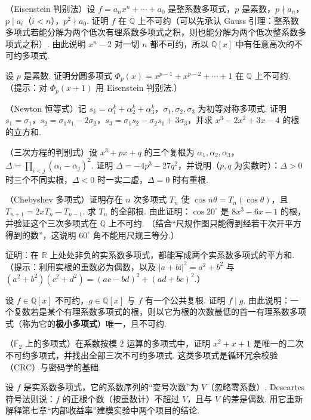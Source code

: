 {		\Cgroup
		\begin{exC}
			\item\label{ex:poly:C1} （Eisenstein 判别法）设 $f=a_nx^n+\cdots+a_0$ 是整系数多项式，$p$ 是素数，$p\nmid a_n$，$p\mid a_i$（$i<n$），$p^2\nmid a_0$. 证明 $f$ 在 $\mathbb{Q}$ 上不可约（可以先承认 Gauss 引理：整系数多项式若能分解为两个低次有理系数多项式之积，则也能分解为两个低次整系数多项式之积）. 由此说明 $x^n-2$ 对一切 $n$ 都不可约，所以 $\mathbb{Q}[x]$ 中有任意高次的不可约多项式.
			\item\label{ex:poly:C2} 设 $p$ 是素数. 证明分圆多项式 $\Phi_p(x)=x^{p-1}+x^{p-2}+\cdots+1$ 在 $\mathbb{Q}$ 上不可约.（提示：对 $\Phi_p(x+1)$ 用 Eisenstein 判别法.）
			\item\label{ex:poly:C3} （Newton 恒等式）记 $s_k=\alpha_1^k+\alpha_2^k+\alpha_3^k$，$\sigma_1,\sigma_2,\sigma_3$ 为初等对称多项式. 证明 $s_1=\sigma_1$，$s_2=\sigma_1s_1-2\sigma_2$，$s_3=\sigma_1s_2-\sigma_2s_1+3\sigma_3$，并求 $x^3-2x^2+3x-4$ 的根的立方和.
			\item\label{ex:poly:C4} （三次方程的判别式）设 $x^3+px+q$ 的三个复根为 $\alpha_1,\alpha_2,\alpha_3$，$\Delta=\prod_{i<j}(\alpha_i-\alpha_j)^2$. 证明 $\Delta=-4p^3-27q^2$，并说明（$p,q$ 为实数时）：$\Delta>0$ 时三个不同实根，$\Delta<0$ 时一实二虚，$\Delta=0$ 时有重根.
			\item\label{ex:poly:C5} （Chebyshev 多项式）证明存在 $n$ 次多项式 $T_n$ 使 $\cos n\theta=T_n(\cos\theta)$，且 $T_{n+1}=2xT_n-T_{n-1}$. 求 $T_n$ 的全部根. 由此证明：$\cos20^\circ$ 是 $8x^3-6x-1$ 的根，并验证这个三次多项式在 $\mathbb{Q}$ 上不可约. （结合“尺规作图只能得到经若干次开平方得到的数”，这说明 $60^\circ$ 角不能用尺规三等分.）
			\item\label{ex:poly:C6} 证明：在 $\mathbb{R}$ 上处处非负的实系数多项式，都能写成两个实系数多项式的平方和.（提示：利用实根的重数必为偶数，以及 $|a+b\mathrm i|^2=a^2+b^2$ 与 $(a^2+b^2)(c^2+d^2)=(ac-bd)^2+(ad+bc)^2$.）
			\item\label{ex:poly:C7} 设 $f\in\mathbb{Q}[x]$ 不可约，$g\in\mathbb{Q}[x]$ 与 $f$ 有一个公共复根. 证明 $f\mid g$. 由此说明：一个复数若是某个有理系数多项式的根，则以它为根的次数最低的首一有理系数多项式（称为它的\textbf{极小多项式}）唯一，且不可约.
			\item\label{ex:poly:C8} （$\mathbb{F}_2$ 上的多项式）在系数按模 $2$ 运算的多项式中，证明 $x^2+x+1$ 是唯一的二次不可约多项式，并找出全部三次不可约多项式. 这类多项式是循环冗余校验（CRC）与密码学的基础.
			\item\label{ex:poly:C9} 设 $f$ 是实系数多项式，它的系数序列的“变号次数”为 $V$（忽略零系数）. Descartes 符号法则说：$f$ 的正根个数（按重数计）不超过 $V$，且与 $V$ 的差是偶数. 用它重新解释第七章“内部收益率”建模实验中两个项目的结论.
		\end{exC}
	}
	
